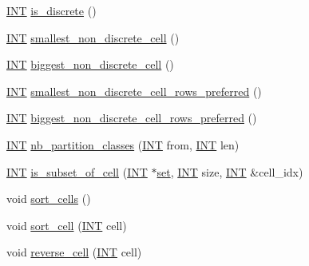 \begin{DoxyCompactItemize}
\item 
\mbox{\hyperlink{galois_8h_a09fddde158a3a20bd2dcadb609de11dc}{I\+NT}} \mbox{\hyperlink{classpartitionstack_ab4968687c725a00a1b57f5c6dc7c2f3b}{is\+\_\+discrete}} ()
\item 
\mbox{\hyperlink{galois_8h_a09fddde158a3a20bd2dcadb609de11dc}{I\+NT}} \mbox{\hyperlink{classpartitionstack_a1fee7aeec20edf677bbc3cd175d1e9e5}{smallest\+\_\+non\+\_\+discrete\+\_\+cell}} ()
\item 
\mbox{\hyperlink{galois_8h_a09fddde158a3a20bd2dcadb609de11dc}{I\+NT}} \mbox{\hyperlink{classpartitionstack_a364dbccc100666a2f567403d0a42ddcc}{biggest\+\_\+non\+\_\+discrete\+\_\+cell}} ()
\item 
\mbox{\hyperlink{galois_8h_a09fddde158a3a20bd2dcadb609de11dc}{I\+NT}} \mbox{\hyperlink{classpartitionstack_acfcb868d6da7defb577d16bd5afe8087}{smallest\+\_\+non\+\_\+discrete\+\_\+cell\+\_\+rows\+\_\+preferred}} ()
\item 
\mbox{\hyperlink{galois_8h_a09fddde158a3a20bd2dcadb609de11dc}{I\+NT}} \mbox{\hyperlink{classpartitionstack_afac36ae1992b98a7f833447c231b9987}{biggest\+\_\+non\+\_\+discrete\+\_\+cell\+\_\+rows\+\_\+preferred}} ()
\item 
\mbox{\hyperlink{galois_8h_a09fddde158a3a20bd2dcadb609de11dc}{I\+NT}} \mbox{\hyperlink{classpartitionstack_a3ec8a7a60eb704fd9b208a46067ae628}{nb\+\_\+partition\+\_\+classes}} (\mbox{\hyperlink{galois_8h_a09fddde158a3a20bd2dcadb609de11dc}{I\+NT}} from, \mbox{\hyperlink{galois_8h_a09fddde158a3a20bd2dcadb609de11dc}{I\+NT}} len)
\item 
\mbox{\hyperlink{galois_8h_a09fddde158a3a20bd2dcadb609de11dc}{I\+NT}} \mbox{\hyperlink{classpartitionstack_ac400cb901fe6a28c2ec7d9ba243ccb62}{is\+\_\+subset\+\_\+of\+\_\+cell}} (\mbox{\hyperlink{galois_8h_a09fddde158a3a20bd2dcadb609de11dc}{I\+NT}} $\ast$\mbox{\hyperlink{nauty_8h_a9690bea211101f22a5e154087590c3da}{set}}, \mbox{\hyperlink{galois_8h_a09fddde158a3a20bd2dcadb609de11dc}{I\+NT}} size, \mbox{\hyperlink{galois_8h_a09fddde158a3a20bd2dcadb609de11dc}{I\+NT}} \&cell\+\_\+idx)
\item 
void \mbox{\hyperlink{classpartitionstack_a6e2783ab6d6b06f37ac21ce529e219b6}{sort\+\_\+cells}} ()
\item 
void \mbox{\hyperlink{classpartitionstack_abb4d78049a6424e54e65a25c7d57dca2}{sort\+\_\+cell}} (\mbox{\hyperlink{galois_8h_a09fddde158a3a20bd2dcadb609de11dc}{I\+NT}} cell)
\item 
void \mbox{\hyperlink{classpartitionstack_a870ecfafbc50b6ae48e3fab862e4b226}{reverse\+\_\+cell}} (\mbox{\hyperlink{galois_8h_a09fddde158a3a20bd2dcadb609de11dc}{I\+NT}} cell)

\end{DoxyCompactItemize}
